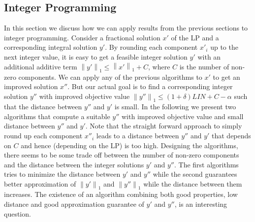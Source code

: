 \documentclass[a4paper,11pt]{article}
\newcommand{\nor}[1]{\left\|#1\right\|}
\begin{document}
\subsection{Integer Programming}
\label{sec:integer}
In this section we discuss how we can apply results from the previous sections to integer programming.
Consider a fractional solution $x'$ of the LP and a corresponding integral solution $y'$. 
By rounding each component $x'_i$ up to the next integer value, it is easy to get a feasible
integer solution $y'$ with an additional additive term $\nor{y'}_1 \leq \nor{x'}_1 +C$, where $C$ is the number of 
non-zero components.
We can apply any of the previous algorithms to $x'$ to get an improved solution $x''$.
But our actual goal is to find a corresponding integer solution $y''$
with improved objective value $\nor{y''}_1 \leq (1+\delta) \mathit{LIN} +C - \alpha$ such that the 
distance between $y''$ and $y'$ is small.
In the following we present two algorithms that compute a suitable $y''$ with improved objective value and small
distance between $y''$ and $y'$.
Note that the straight forward approach to simply round up each component $x''_i$ leads to a distance between
$y''$ and $y'$ that depends on $C$ and hence (depending on the LP) is too high.
Designing the algorithms, there seems to be some trade off between the number of non-zero components and the
distance between the integer solutions $y'$ and $y''$. The first algorithms tries to minimize the distance 
between $y'$ and $y''$ while
the second guarantees better approximation of $\nor{y'}_1$ and $\nor{y''}_1$ while the distance between them increases.
The existence of an algorithm combining both good properties, low distance and good approximation guarantee of 
$y'$ and $y''$, is an interesting question.
\end{document}

